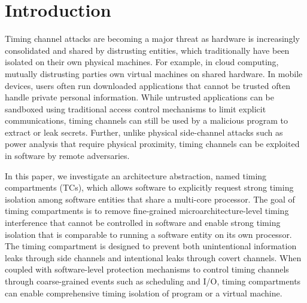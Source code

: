 \section{Introduction}

Timing channel attacks are becoming a major threat as hardware is increasingly 
consolidated and shared by distrusting entities, which traditionally have been
isolated on their own physical machines. For example, in cloud computing, mutually distrusting 
parties own virtual machines on shared hardware. In mobile devices, users often
run downloaded applications that cannot be trusted often handle private personal
information.
While untrusted applications can be sandboxed using
traditional access control mechanisms to limit explicit communications,
timing 
channels can still be used by a malicious program to extract or leak secrets.
Further, unlike physical side-channel attacks such as power analysis that require
physical proximity, timing channels can be exploited in software by remote
adversaries.



In this paper, we investigate an architecture abstraction, named timing compartments (TCs),
which allows software to explicitly request strong timing isolation among software
entities that share a multi-core processor.
The goal of timing compartments is to remove fine-grained microarchitecture-level timing interference
that cannot be controlled in software and enable strong timing isolation that is
comparable to running a software entity on its own processor.
The timing compartment is designed to prevent both unintentional information leaks
through side channels and intentional leaks through covert channels.
When coupled with software-level protection mechanisms to control timing channels 
through coarse-grained events such as scheduling and I/O, timing compartments
can enable comprehensive timing isolation of program or a virtual machine.

